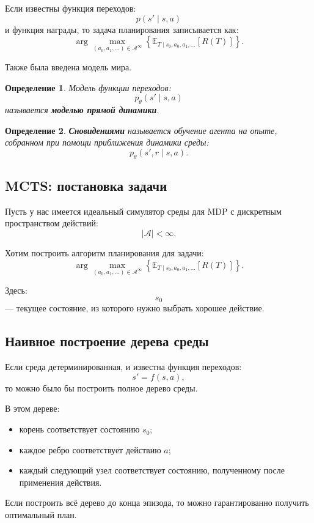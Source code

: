 \documentclass[12pt,a4paper]{article}
\newtheorem{definition}{Определение}
\begin{document}
Если известны функция переходов:
\[
p(s'\mid s,a)
\]
и функция награды, то задача планирования записывается как:
\[
\arg\max_{(a_0,a_1,\ldots)\in\mathcal A^\infty}
\left\{
\mathbb E_{T\mid s_0,a_0,a_1,\ldots}
\left[
R(T)
\right]
\right\}.
\]

Также была введена модель мира.

\begin{definition}
Модель функции переходов:
\[
p_\theta(s'\mid s,a)
\]
называется \textbf{моделью прямой динамики}.
\end{definition}

\begin{definition}
\textbf{Сновидениями} называется обучение агента на опыте, собранном при помощи приближения динамики среды:
\[
p_\theta(s',r\mid s,a).
\]
\end{definition}

\subsection{MCTS: постановка задачи}

Пусть у нас имеется идеальный симулятор среды для MDP с дискретным пространством действий:
\[
|\mathcal A|<\infty.
\]

Хотим построить алгоритм планирования для задачи:
\[
\arg\max_{(a_0,a_1,\ldots)\in\mathcal A^\infty}
\left\{
\mathbb E_{T\mid s_0,a_0,a_1,\ldots}
\left[
R(T)
\right]
\right\}.
\]

Здесь:
\[
s_0
\]
--- текущее состояние, из которого нужно выбрать хорошее действие.

\subsection{Наивное построение дерева среды}

Если среда детерминированная, и известна функция переходов:
\[
s'=f(s,a),
\]
то можно было бы построить полное дерево среды.

В этом дереве:
\begin{itemize}
    \item корень соответствует состоянию $s_0$;
    \item каждое ребро соответствует действию $a$;
    \item каждый следующий узел соответствует состоянию, полученному после применения действия.
\end{itemize}

Если построить всё дерево до конца эпизода, то можно гарантированно получить оптимальный план.
\end{document}
